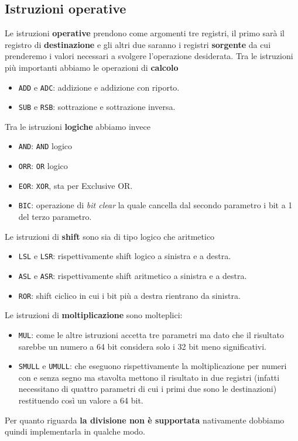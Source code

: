 \subsection{Istruzioni operative}
Le istruzioni \textbf{operative} prendono come argomenti tre registri, il primo sarà il registro di
\textbf{destinazione} e gli altri due saranno i registri \textbf{sorgente} da cui prenderemo i
valori necessari a svolgere l'operazione desiderata. Tra le istruzioni più importanti abbiamo le
operazioni di \textbf{calcolo}
\begin{itemize}
	\item \verb|ADD| e \verb|ADC|: addizione e addizione con riporto.
	\item \verb|SUB| e \verb|RSB|: sottrazione e sottrazione inversa.
\end{itemize}
Tra le istruzioni \textbf{logiche} abbiamo invece
\begin{itemize}
	\item \verb|AND|: \verb|AND| logico
	\item \verb|ORR|: \verb|OR| logico
	\item \verb|EOR|: \verb|XOR|, sta per Exclusive OR.
	\item \verb|BIC|: operazione di \emph{bit clear} la quale cancella dal secondo parametro i bit
	      a 1 del terzo parametro.
\end{itemize}
Le istruzioni di \textbf{shift} sono sia di tipo logico che aritmetico
\begin{itemize}
	\item \verb|LSL| e \verb|LSR|: rispettivamente shift logico a sinistra e a destra.
	\item \verb|ASL| e \verb|ASR|: rispettivamente shift aritmetico a sinistra e a destra.
	\item \verb|ROR|: shift ciclico in cui i bit più a destra rientrano da sinistra.
\end{itemize}
Le istruzioni di \textbf{moltiplicazione} sono molteplici:
\begin{itemize}
	\item \verb|MUL|: come le altre istruzioni accetta tre parametri ma dato che il risultato
	      sarebbe un numero a 64 bit considera solo i 32 bit meno significativi.
	\item \verb|SMULL| e \verb|UMULL|: che eseguono rispettivamente la moltiplicazione per numeri
	      con e senza segno ma stavolta mettono il risultato in due registri (infatti necessitano
	      di quattro parametri di cui i primi due sono le destinazioni) restituendo così un valore
	      a 64 bit.
\end{itemize}
Per quanto riguarda \textbf{la divisione non è supportata} nativamente dobbiamo quindi
implementarla in qualche modo.

